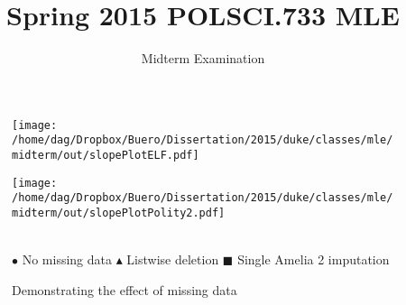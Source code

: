 \documentclass[draft=true,parskip=half]{scrartcl}\usepackage[]{graphicx}\usepackage[]{color}
\title{Spring 2015 POLSCI.733 MLE}
\subtitle{Midterm Examination}
\author{}
\begin{document}
\maketitle

 \begin{figure}[!htb]
     \centering
     \caption{Demonstrating the effect of missing data}
     \begin{minipage}{.49\textwidth}
         \centering
         \texttt{[image: /home/dag/Dropbox/Buero/Dissertation/2015/duke/classes/mle/midterm/out/slopePlotELF.pdf]}
     \end{minipage}%
     \hfill
     \begin{minipage}{.49\textwidth}
         \centering
         \texttt{[image: /home/dag/Dropbox/Buero/Dissertation/2015/duke/classes/mle/midterm/out/slopePlotPolity2.pdf]}
     \end{minipage}\\
\footnotesize{%
 $\bullet$ No missing data $\blacktriangle$ Listwise deletion
 $\blacksquare$ Single Amelia 2 imputation%
}
\end{figure}
\end{document}
